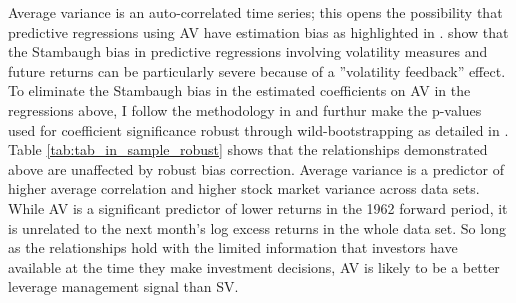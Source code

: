 Average variance is an auto-correlated time series; this opens the possibility that predictive regressions using AV have estimation bias as highlighted in \citet{stambaugh_predictive_1999}. \citet{campbell_no_1992} show that the Stambaugh bias in predictive regressions involving volatility measures and future returns can be particularly severe because of a ”volatility feedback” effect. To eliminate the Stambaugh bias in the estimated coefficients on AV in the regressions above, I follow the methodology in \citet{Amihud2004} and furthur make the p-values used for coefficient significance robust through wild-bootstrapping as detailed in \citet{mackinnon_bootstrap_2002}. Table \ref{tab:tab_in_sample_robust} shows that the relationships demonstrated above are unaffected by robust bias correction. Average variance is a predictor of higher average correlation and higher stock market variance across data sets. While AV is a significant predictor of lower returns in the 1962 forward period, it is unrelated to the next month’s log excess returns in the whole data set. So long as the relationships hold with the limited information that investors have available at the time they make investment decisions, AV is likely to be a better leverage management signal than SV.
